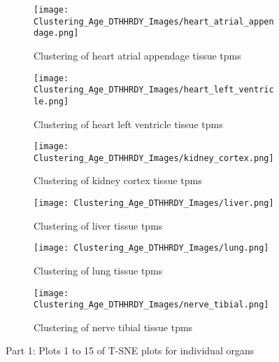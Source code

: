 \documentclass[twocolumn]{article}
\begin{document}
\begin{figure}[H]
    \vspace{1em}

    \begin{subfigure}{0.3\linewidth}
        \texttt{[image: Clustering\_Age\_DTHHRDY\_Images/heart\_atrial\_appendage.png]}
        \caption{Clustering of heart atrial appendage tissue tpms}
    \end{subfigure}
    \hfill
    \begin{subfigure}{0.3\linewidth}
        \texttt{[image: Clustering\_Age\_DTHHRDY\_Images/heart\_left\_ventricle.png]}
        \caption{Clustering of heart left ventricle tissue tpms}
    \end{subfigure}
    \hfill
    \begin{subfigure}{0.3\linewidth}
        \texttt{[image: Clustering\_Age\_DTHHRDY\_Images/kidney\_cortex.png]}
        \caption{Clustering of kidney cortex tissue tpms}
    \end{subfigure}

    \vspace{1em}

    \begin{subfigure}{0.3\linewidth}
        \texttt{[image: Clustering\_Age\_DTHHRDY\_Images/liver.png]}
        \caption{Clustering of liver tissue tpms}
    \end{subfigure}
    \hfill
    \begin{subfigure}{0.3\linewidth}
        \texttt{[image: Clustering\_Age\_DTHHRDY\_Images/lung.png]}
        \caption{Clustering of lung tissue tpms}
    \end{subfigure}
    \hfill
    \begin{subfigure}{0.3\linewidth}
        \texttt{[image: Clustering\_Age\_DTHHRDY\_Images/nerve\_tibial.png]}
        \caption{Clustering of nerve tibial tissue tpms}
    \end{subfigure}

    \caption{Part 1: Plots 1 to 15 of T-SNE plots for individual organs}
    \label{fig:T-SNE plots for individual organs_part1}
\end{figure}
\end{document}
